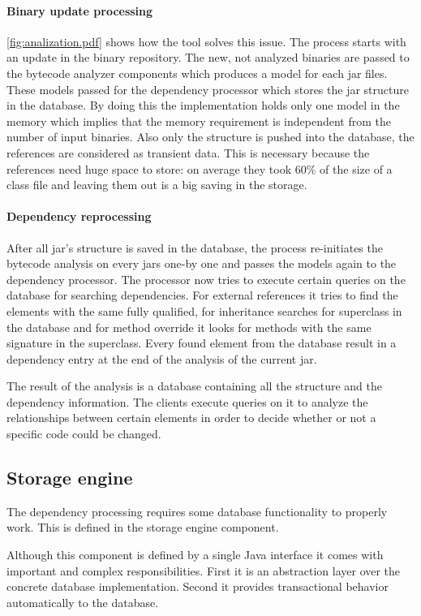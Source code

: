 \paragraph{Binary update processing}
\autoref{fig:analization.pdf} shows how the tool solves this issue. The process
starts with an update in the binary repository. The new, not analyzed binaries
are passed to the bytecode analyzer components which produces a model for each
jar files. These models passed for the dependency processor which stores the jar
structure in the database. By doing this the implementation holds only one model
in the memory which implies that the memory requirement is independent from the
number of input binaries. Also only the structure is pushed into the database,
the references are considered as transient data. This is necessary because the
references need huge space to store: on average they took 60\% of the size of a
class file and leaving them out is a big saving in the storage.

\paragraph{Dependency reprocessing} 
After all jar's  structure is saved in the database, the process re-initiates
the bytecode analysis on every jars one-by one and passes the models again to
the dependency processor. The processor now tries to execute certain queries on
the database for searching dependencies. For external references it tries to
find the elements with the same fully qualified, for inheritance searches for
superclass in the database and for method override it looks for methods with
the same signature in the superclass. Every found element from the database 
result in a dependency entry at the end of the analysis of the current jar. 

The result of the analysis is a database containing all the structure
and the dependency information. The clients execute queries on it to analyze the
relationships between certain elements in order to decide whether or not a
specific code could be changed.
 
 
\subsection{Storage engine} 
The dependency processing requires some database functionality to 
properly work. This is defined in the storage engine component.

Although this component is defined by a single Java interface it comes with
important and complex responsibilities. First it is an abstraction layer over
the concrete database implementation. Second it provides transactional behavior
automatically to the database. 

